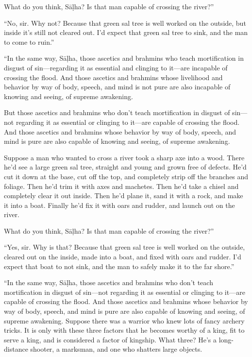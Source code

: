 \documentclass[12pt,openany]{book}%
\begin{document}
What do you think, \textsanskrit{Sāḷha}? Is that man capable of crossing the river?” 

“No, sir. Why not? Because that green sal tree is well worked on the outside, but inside it’s still not cleared out. I’d expect that green sal tree to sink, and the man to come to ruin.” 

“In the same way, \textsanskrit{Sāḷha}, those ascetics and brahmins who teach mortification in disgust of sin—regarding it as essential and clinging to it—are incapable of crossing the flood. And those ascetics and brahmins whose livelihood and behavior by way of body, speech, and mind is not pure are also incapable of knowing and seeing, of supreme awakening. 

But those ascetics and brahmins who don’t teach mortification in disgust of sin—not regarding it as essential or clinging to it—are capable of crossing the flood. And those ascetics and brahmins whose behavior by way of body, speech, and mind is pure are also capable of knowing and seeing, of supreme awakening. 

Suppose a man who wanted to cross a river took a sharp axe into a wood. There he’d see a large green sal tree, straight and young and grown free of defects. He’d cut it down at the base, cut off the top, and completely strip off the branches and foliage. Then he’d trim it with axes and machetes. Then he’d take a chisel and completely clear it out inside. Then he’d plane it, sand it with a rock, and make it into a boat. Finally he’d fix it with oars and rudder, and launch out on the river. 

What do you think, \textsanskrit{Sāḷha}? Is that man capable of crossing the river?” 

“Yes, sir. Why is that? Because that green sal tree is well worked on the outside, cleared out on the inside, made into a boat, and fixed with oars and rudder. I’d expect that boat to not sink, and the man to safely make it to the far shore.” 

“In the same way, \textsanskrit{Sāḷha}, those ascetics and brahmins who don’t teach mortification in disgust of sin—not regarding it as essential or clinging to it—are capable of crossing the flood. And those ascetics and brahmins whose behavior by way of body, speech, and mind is pure are also capable of knowing and seeing, of supreme awakening. Suppose there was a warrior who knew lots of fancy archery tricks. It is only with these three factors that he becomes worthy of a king, fit to serve a king, and is considered a factor of kingship. What three? He’s a long-distance shooter, a marksman, and one who shatters large objects. 
\end{document}
